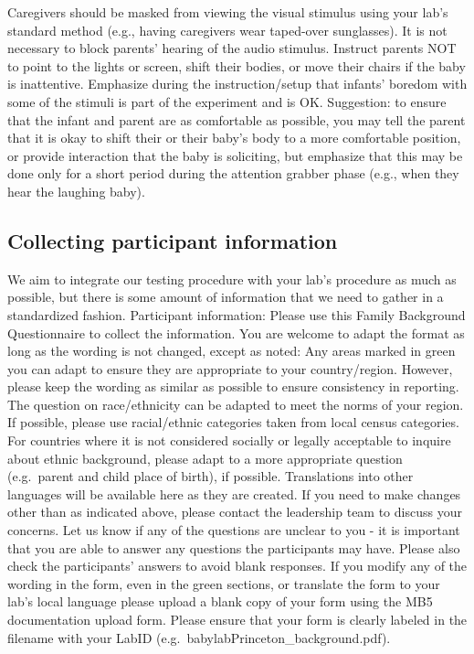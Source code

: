 \documentclass[
]{book}
\begin{document}
Caregivers should be masked from viewing the visual stimulus using your lab's standard method (e.g., having caregivers wear taped-over sunglasses).
It is not necessary to block parents' hearing of the audio stimulus.
Instruct parents NOT to point to the lights or screen, shift their bodies, or move their chairs if the baby is inattentive. Emphasize during the instruction/setup that infants' boredom with some of the stimuli is part of the experiment and is OK.
Suggestion: to ensure that the infant and parent are as comfortable as possible, you may tell the parent that it is okay to shift their or their baby's body to a more comfortable position, or provide interaction that the baby is soliciting, but emphasize that this may be done only for a short period during the attention grabber phase (e.g., when they hear the laughing baby).

\hypertarget{collecting-participant-information}{%
\subsection{Collecting participant information}\label{collecting-participant-information}}

We aim to integrate our testing procedure with your lab's procedure as much as possible, but there is some amount of information that we need to gather in a standardized fashion.
Participant information: Please use this Family Background Questionnaire to collect the information. You are welcome to adapt the format as long as the wording is not changed, except as noted:
Any areas marked in green you can adapt to ensure they are appropriate to your country/region. However, please keep the wording as similar as possible to ensure consistency in reporting.
The question on race/ethnicity can be adapted to meet the norms of your region. If possible, please use racial/ethnic categories taken from local census categories. For countries where it is not considered socially or legally acceptable to inquire about ethnic background, please adapt to a more appropriate question (e.g.~parent and child place of birth), if possible.
Translations into other languages will be available here as they are created.
If you need to make changes other than as indicated above, please contact the leadership team to discuss your concerns.
Let us know if any of the questions are unclear to you - it is important that you are able to answer any questions the participants may have. Please also check the participants' answers to avoid blank responses.
If you modify any of the wording in the form, even in the green sections, or translate the form to your lab's local language please upload a blank copy of your form using the MB5 documentation upload form. Please ensure that your form is clearly labeled in the filename with your LabID (e.g.~babylabPrinceton\_background.pdf).
\end{document}

